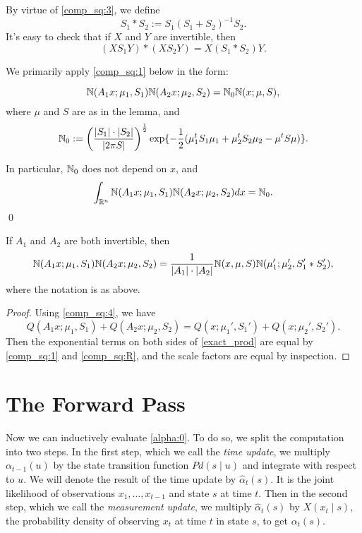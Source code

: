 \documentclass[12pt,leqno]{article}
\begin{document}
By virtue of \eqref{comp_sq:3}, we define
$$
S_1*S_2 := S_1(S_1+S_2)^{-1}S_2.
$$
It's easy to check that if $X$ and $Y$ are invertible, then
\begin{equation}\label{comp_sq:XY}
  (XS_1Y)*(XS_2Y) = X(S_1*S_2)Y. 
\end{equation}

We primarily apply \eqref{comp_sq:1} below in the form: 
\begin{Cor}\label{comp_sq:2}
$$
  {\mathbb N}(A_1x;\mu_1,S_1){\mathbb N}(A_2x;\mu_2,S_2) = {\mathbb N}_0{\mathbb N}(x;\mu,S),
  $$
where $\mu$ and $S$ are as in the lemma, and 
$$
{\mathbb N}_0 := \left(\frac{|S_1|\cdot|S_2|}{|2\pi{S}|}\right)^{\frac{1}{2}}\exp\{-\frac{1}{2}(\mu_1^tS_1\mu_1 + \mu_2^tS_2\mu_2-\mu^tS\mu)\}.
$$

In particular, ${\mathbb N}_0$ does not depend on $x$, and
\begin{equation}\label{comp_sq:int}
  \int_{{\mathbb R}^{n}}  {\mathbb N}(A_1x;\mu_1,S_1){\mathbb N}(A_2x;\mu_2,S_2)dx = {\mathbb N}_0.
\end{equation}
\qed
\end{Cor}

\begin{Cor}\label{exact_prod} 
 If $A_1$ and $A_2$ are both invertible, then 
$$
 {\mathbb N}(A_1x;\mu_1,S_1){\mathbb N}(A_2x;\mu_2,S_2)   = \frac{1}{|A_1|\cdot|A_2|}{\mathbb N}(x,\mu,S){\mathbb N}(\mu_1';\mu_2',S_1'*S_2'),
$$
 where the notation is as above.
\end{Cor}
\begin{proof}

  Using \eqref{comp_sq:4}, we have
$$
  Q(A_1x;\mu_1,S_1) + Q(A_2x;\mu_2,S_2)  = Q(x;\mu_1',S_1') + Q(x;\mu_2',S_2').
$$
  Then the exponential terms on both sides of \eqref{exact_prod} are equal by
  \eqref{comp_sq:1} and \eqref{comp_sq:R}, and the scale factors are equal by inspection.
\end{proof}


\section{The Forward Pass}
  Now we can inductively evaluate \eqref{alpha:0}. To do so, we split the computation
  into two steps.  In the first step, which we call the {\em time update}, we multiply
\  $\alpha_{t-1}(u)$ by the state transition function $Pd(s\mid u)$ and integrate with respect
  to $u$. We will denote the result of the time update by $\hat{\alpha}_t(s)$.  It is the joint 
  likelihood of observations $x_1,\dots,x_{t-1}$ and state $s$ at time $t$.
  Then in the second step, which we call the {\em measurement update}, we multiply
  $\hat{\alpha}_t(s)$ by $X(x_t \mid s)$, the probability density of observing $x_t$ at time $t$
  in state $s$, to get $\alpha_t(s)$.  %
\end{document}
